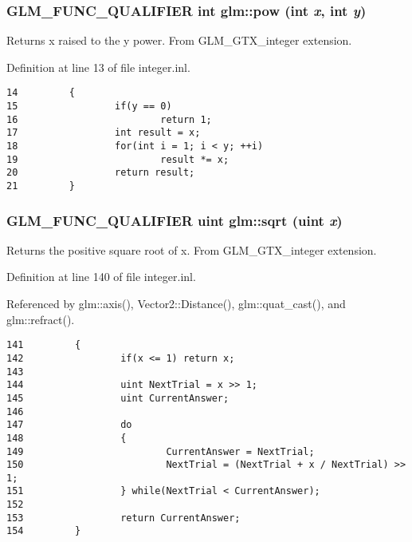 \hypertarget{group__gtx__integer_g9642514a44a67afa70966d756f040ca9}{
\subsubsection[pow]{\setlength{\rightskip}{0pt plus 5cm}GLM\_\-FUNC\_\-QUALIFIER int glm::pow (int {\em x}, \/  int {\em y})}}
\label{group__gtx__integer_g9642514a44a67afa70966d756f040ca9}


Returns x raised to the y power. From GLM\_\-GTX\_\-integer extension. 

Definition at line 13 of file integer.inl.

\begin{Code}\begin{verbatim}14         {
15                 if(y == 0)
16                         return 1;
17                 int result = x;
18                 for(int i = 1; i < y; ++i)
19                         result *= x;
20                 return result;
21         }
\end{verbatim}
\end{Code}


\hypertarget{group__gtx__integer_g457e9efca8339bf918d319e9c55f7c8f}{
\subsubsection[sqrt]{\setlength{\rightskip}{0pt plus 5cm}GLM\_\-FUNC\_\-QUALIFIER uint glm::sqrt (uint {\em x})}}
\label{group__gtx__integer_g457e9efca8339bf918d319e9c55f7c8f}


Returns the positive square root of x. From GLM\_\-GTX\_\-integer extension. 

Definition at line 140 of file integer.inl.

Referenced by glm::axis(), Vector2::Distance(), glm::quat\_\-cast(), and glm::refract().

\begin{Code}\begin{verbatim}141         {
142                 if(x <= 1) return x;
143 
144                 uint NextTrial = x >> 1;
145                 uint CurrentAnswer;
146 
147                 do
148                 {
149                         CurrentAnswer = NextTrial;
150                         NextTrial = (NextTrial + x / NextTrial) >> 1;
151                 } while(NextTrial < CurrentAnswer);
152 
153                 return CurrentAnswer;
154         }
\end{verbatim}
\end{Code}




